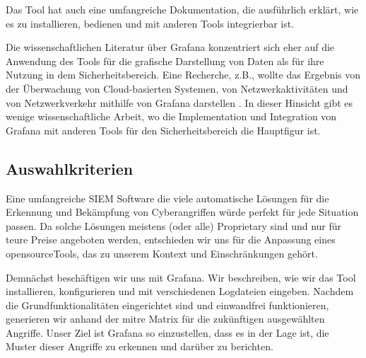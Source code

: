 Das Tool hat auch eine umfangreiche Dokumentation, die ausführlich erklärt, wie es zu installieren, bedienen und mit anderen Tools integrierbar ist. 


Die wissenschaftlichen Literatur über Grafana konzentriert sich eher auf die Anwendung des Tools für die grafische Darstellung von Daten als für ihre Nutzung in dem Sicherheitsbereich. Eine Recherche, z.B., wollte das Ergebnis von der Überwachung von Cloud-basierten Systemen, von Netzwerkaktivitäten und von Netzwerkverkehr mithilfe von Grafana darstellen \citep{Manases_grafananetwork}. In dieser Hinsicht gibt es wenige wissenschaftliche Arbeit, wo die Implementation und Integration von Grafana mit anderen Tools für den Sicherheitsbereich die Hauptfigur ist.

\subsection{Auswahlkriterien}
Eine umfangreiche \gls{SIEM} Software die viele automatische Lösungen für die Erkennung und Bekämpfung von Cyberangriffen würde perfekt für jede Situation passen. Da solche Lösungen meistens (oder alle) \gls{Proprietary} sind und nur für teure Preise angeboten werden, entschieden wir uns für die Anpassung eines \gls{opensource}Tools, das zu unserem Kontext und Einschränkungen gehört. 

Demnächst beschäftigen wir uns mit Grafana. Wir beschreiben, wie wir das Tool installieren, konfigurieren und mit verschiedenen Logdateien eingeben. Nachdem die Grundfunktionalitäten eingerichtet sind und einwandfrei funktionieren, generieren wir anhand der \gls{mitre} Matrix  für die zukünftigen ausgewählten Angriffe. Unser Ziel ist Grafana so einzustellen, dass es in der Lage ist, die Muster dieser Angriffe zu erkennen und darüber zu berichten.
